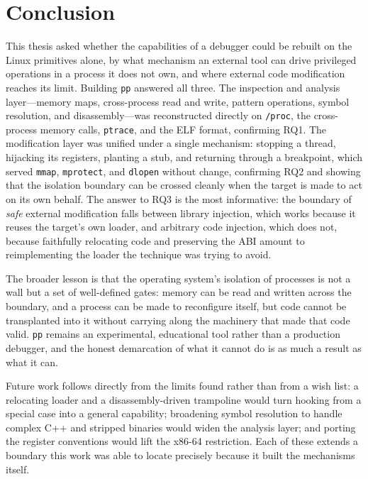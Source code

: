 \documentclass[10pt,twocolumn,a4paper]{article}
\begin{document}
\section{Conclusion}\label{sec:conclusion}
This thesis asked whether the capabilities of a debugger could be rebuilt on the
Linux primitives alone, by what mechanism an external tool can drive privileged
operations in a process it does not own, and where external code modification
reaches its limit. Building \texttt{pp} answered all three. The inspection and
analysis layer---memory maps, cross-process read and write, pattern operations,
symbol resolution, and disassembly---was reconstructed directly on \texttt{/proc},
the cross-process memory calls, \texttt{ptrace}, and the ELF format, confirming
RQ1. The modification layer was unified under a single mechanism: stopping a
thread, hijacking its registers, planting a stub, and returning through a
breakpoint, which served \texttt{mmap}, \texttt{mprotect}, and \texttt{dlopen}
without change, confirming RQ2 and showing that the isolation boundary can be
crossed cleanly when the target is made to act on its own behalf. The answer to
RQ3 is the most informative: the boundary of \emph{safe} external modification
falls between library injection, which works because it reuses the target's own
loader, and arbitrary code injection, which does not, because faithfully relocating
code and preserving the ABI amount to reimplementing the loader the technique was
trying to avoid.

The broader lesson is that the operating system's isolation of processes is not a
wall but a set of well-defined gates: memory can be read and written across the
boundary, and a process can be made to reconfigure itself, but code cannot be
transplanted into it without carrying along the machinery that made that code
valid. \texttt{pp} remains an experimental, educational tool rather than a
production debugger, and the honest demarcation of what it cannot do is as much a
result as what it can.

Future work follows directly from the limits found rather than from a wish list:
a relocating loader and a disassembly-driven trampoline would turn hooking from a
special case into a general capability; broadening symbol resolution to handle
complex C++ and stripped binaries would widen the analysis layer; and porting the
register conventions would lift the x86-64 restriction. Each of these extends a
boundary this work was able to locate precisely because it built the mechanisms
itself.
\end{document}
